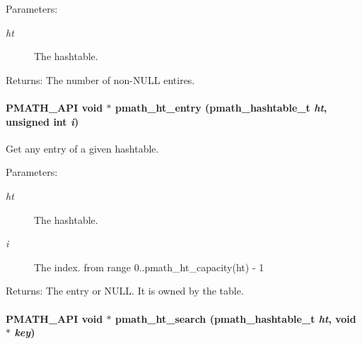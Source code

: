 \begin{Desc}
\item[Parameters:]
\begin{description}
\item[{\em ht}]The hashtable. \end{description}
\end{Desc}
\begin{Desc}
\item[Returns:]The number of non-NULL entires. \end{Desc}
\hypertarget{group__hashtables_gd3f57058604e14d27b61a0282c02be87}{
\paragraph[{pmath\_\-ht\_\-entry}]{\setlength{\rightskip}{0pt plus 5cm}PMATH\_\-API void $\ast$ pmath\_\-ht\_\-entry ({\bf pmath\_\-hashtable\_\-t} {\em ht}, \/  unsigned int {\em i})}\hfill}
\label{group__hashtables_gd3f57058604e14d27b61a0282c02be87}


Get any entry of a given hashtable. 

\begin{Desc}
\item[Parameters:]
\begin{description}
\item[{\em ht}]The hashtable. \item[{\em i}]The index. from range 0..pmath\_\-ht\_\-capacity(ht) - 1 \end{description}
\end{Desc}
\begin{Desc}
\item[Returns:]The entry or NULL. It is owned by the table. \end{Desc}
\hypertarget{group__hashtables_g94ad66bd7413d8237fa3f58ef8e944a1}{
\paragraph[{pmath\_\-ht\_\-search}]{\setlength{\rightskip}{0pt plus 5cm}PMATH\_\-API void $\ast$ pmath\_\-ht\_\-search ({\bf pmath\_\-hashtable\_\-t} {\em ht}, \/  void $\ast$ {\em key})}\hfill}
\label{group__hashtables_g94ad66bd7413d8237fa3f58ef8e944a1}


